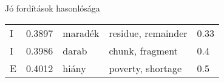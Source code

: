 \documentclass{beamer}
\begin{document}
\begin{frame}[allowframebreaks]{Jó fordítások hasonlósága}
\begin{longtable}{lllll}
        I	& 0.3897	& maradék	& residue, remainder	& 0.33 \\
        I	& 0.3986	& darab	& chunk, fragment	& 0.4 \\
        E	& 0.4012	& hiány	& poverty, shortage	& 0.5 \\

\end{longtable}
\end{frame}
\end{document}

